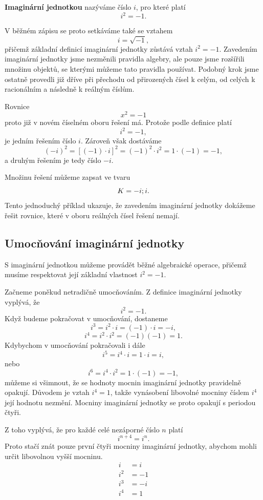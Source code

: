 \documentclass[12pt,a4paper]{article}
\begin{document}
\begin{definitionbox}
\textbf{Imaginární jednotkou} nazýváme číslo $i$, pro které platí
\[
    i^2=-1.
\]
\end{definitionbox}

V běžném zápisu se proto setkáváme také se vztahem
\[
    i=\sqrt{-1},
\]
přičemž základní definicí imaginární jednotky zůstává vztah $i^2=-1$.
Zavedením imaginární jednotky jsme nezměnili pravidla algebry, ale pouze jsme
rozšířili množinu objektů, se kterými můžeme tato pravidla používat. Podobný krok
jsme ostatně provedli již dříve při přechodu od přirozených čísel k celým, od celých
k racionálním a následně k reálným číslům.

Rovnice
\[
    x^2=-1
\]
proto již v novém číselném oboru řešení má. Protože podle definice platí
\[
    i^2=-1,
\]
je jedním řešením číslo \(i\). Zároveň však dostáváme
\[
    (-i)^2 = \left[(-1) \cdot i\right]^2 = (-1)^2 \cdot i^2 = 1 \cdot (-1) = -1,
\]
a druhým řešením je tedy číslo \(-i\).

Množinu řešení můžeme zapsat ve tvaru
\[
    K=\\{-i;i\\}.
\]
Tento jednoduchý příklad ukazuje, že zavedením imaginární jednotky dokážeme řešit
rovnice, které v oboru reálných čísel řešení nemají.


\subsection{Umocňování imaginární jednotky}
S imaginární jednotkou můžeme provádět běžné algebraické operace, přičemž musíme
respektovat její základní vlastnost $i^2=-1$.

Začneme poněkud netradičně umocňováním. Z definice imaginární jednotky vyplývá, že
\[
    i^2=-1.
\]
Když budeme pokračovat v umocňování, dostaneme
\[
    i^3=i^2\cdot i=(-1)\cdot i=-i,
\]
\[
    i^4=i^2\cdot i^2=(-1)(-1)=1.
\]
Kdybychom v umocňování pokračovali i dále
\[
    i^5=i^4\cdot i=1\cdot i=i,
\]
nebo
\[
    i^6=i^4\cdot i^2=1\cdot(-1)=-1,
\]
můžeme si všimnout, že se hodnoty mocnin imaginární jednotky pravidelně opakují.
Důvodem je vztah $i^4=1$, takže vynásobení libovolné mocniny číslem $i^4$
její hodnotu nezmění. Mocniny imaginární jednotky se proto opakují s periodou čtyři.

Z toho vyplývá, že pro každé celé nezáporné číslo \(n\) platí
\[
    i^{n+4}=i^n.
\]
Proto stačí znát pouze první čtyři mocniny imaginární jednotky, 
abychom mohli určit libovolnou vyšší mocninu.
\begin{align*}
    i   &= i    \\
    i^2 &= -1   \\
    i^3 &= -i   \\
    i^4 &= 1
\end{align*}
\end{document}
